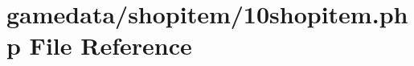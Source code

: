 \hypertarget{10shopitem_8php}{\section{gamedata/shopitem/10shopitem.php File Reference}
\label{10shopitem_8php}
}
